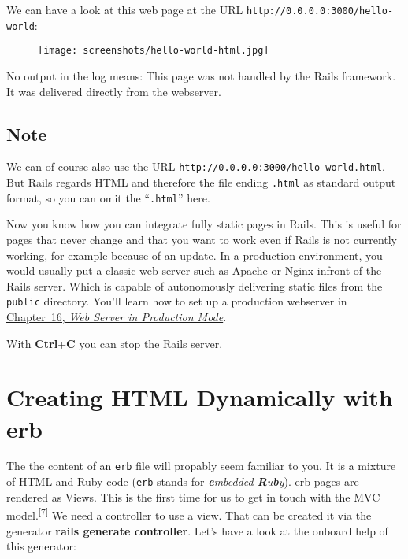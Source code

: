 \documentclass[a4paper]{book}
\newcommand{\chap}[1]{\newpage\thispagestyle{empty}\chapter{#1}\label{chap:\thechapter}}
\begin{document}
We can have a look at this web page at the URL \texttt{http://0.0.0.0:3000/hello-world}:

\begin{figure}[htbp]
\centering
\texttt{[image: screenshots/hello-world-html.jpg]}
\end{figure}

No output in the log means: This page was not handled by the Rails framework. It was delivered directly from the webserver.

\section{Note}\label{note-14}

We can of course also use the URL \texttt{http://0.0.0.0:3000/hello-world.html}. But Rails regards HTML and therefore the file ending \texttt{.html} as standard output format, so you can omit the “\texttt{.html}” here.

Now you know how you can integrate fully static pages in Rails. This is useful for pages that never change and that you want to work even if Rails is not currently working, for example because of an update. In a production environment, you would usually put a classic web server such as Apache or Nginx infront of the Rails server. Which is capable of autonomously delivering static files from the \texttt{public} directory. You'll learn how to set up a production webserver in \hyperref[railsux5fproductionux5fwebserver]{Chapter~16, \emph{Web Server in Production Mode}}.

With \textbf{Ctrl}+\textbf{C} you can stop the Rails server.

\chap{Creating HTML Dynamically with erb}\label{creating-html-dynamically-with-erb}

The the content of an \texttt{erb} file will propably seem familiar to you. It is a mixture of HTML and Ruby code (\texttt{erb} stands for \emph{\textbf{e}mbedded \textbf{R}u\textbf{b}y}). erb pages are rendered as Views. This is the first time for us to get in touch with the MVC model.\textsuperscript{{[}\hyperref[ftn.idp1456352]{7}{]}} We need a controller to use a view. That can be created it via the generator \textbf{rails generate controller}. Let's have a look at the onboard help of this generator:
\end{document}
